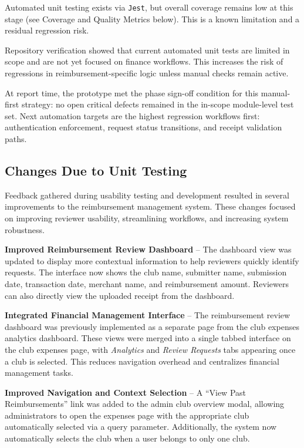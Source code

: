 \documentclass[12pt, titlepage]{article}
\begin{document}
Automated unit testing exists via \texttt{Jest}, but overall coverage remains
low at this stage (see Coverage and Quality Metrics below). This is a known
limitation and a residual regression risk.

Repository verification showed that current automated unit tests are limited in
scope and are not yet focused on finance workflows. This increases the risk of
regressions in reimbursement-specific logic unless manual checks remain active.

At report time, the prototype met the phase sign-off condition for this
manual-first strategy: no open critical defects remained in the in-scope
module-level test set. Next automation targets are the highest regression
workflows first: authentication enforcement, request status transitions, and
receipt validation paths.

\subsection{Changes Due to Unit Testing}

Feedback gathered during usability testing and development resulted in several improvements to the reimbursement management system. These changes focused on improving reviewer usability, streamlining workflows, and increasing system robustness.

\textbf{Improved Reimbursement Review Dashboard} – The dashboard view was updated to display more contextual information to help reviewers quickly identify requests. The interface now shows the club name, submitter name, submission date, transaction date, merchant name, and reimbursement amount. Reviewers can also directly view the uploaded receipt from the dashboard.

\textbf{Integrated Financial Management Interface} – The reimbursement review dashboard was previously implemented as a separate page from the club expenses analytics dashboard. These views were merged into a single tabbed interface on the club expenses page, with \textit{Analytics} and \textit{Review Requests} tabs appearing once a club is selected. This reduces navigation overhead and centralizes financial management tasks.

\textbf{Improved Navigation and Context Selection} – A ``View Past Reimbursements'' link was added to the admin club overview modal, allowing administrators to open the expenses page with the appropriate club automatically selected via a query parameter. Additionally, the system now automatically selects the club when a user belongs to only one club.
\end{document}

